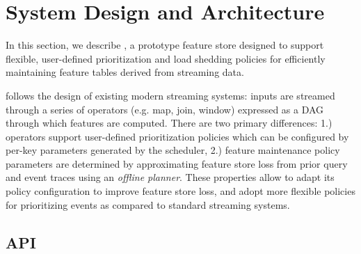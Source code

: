 \section{System Design and Architecture}
In this section, we describe \system{}, a prototype feature store designed to support flexible, user-defined prioritization and load shedding policies for efficiently maintaining feature tables derived from streaming data. 

\system{} follows the design of existing modern streaming systems: inputs are streamed through a series of operators  (e.g. map, join, window) expressed as a DAG through which features are computed.  There are two primary differences: 1.) operators support user-defined prioritization policies which can be configured by per-key parameters generated by the scheduler, 2.) feature maintenance policy parameters are determined by approximating feature store loss from prior query and event traces using an \textit{offline planner}. These properties allow \system{} to adapt its policy configuration to improve feature store loss, and adopt more flexible policies for prioritizing events as compared to standard streaming systems. 

\label{s:design}
\subsection{API}
\label{ss:design:api}
%

%
%
%
%
%
%
%

